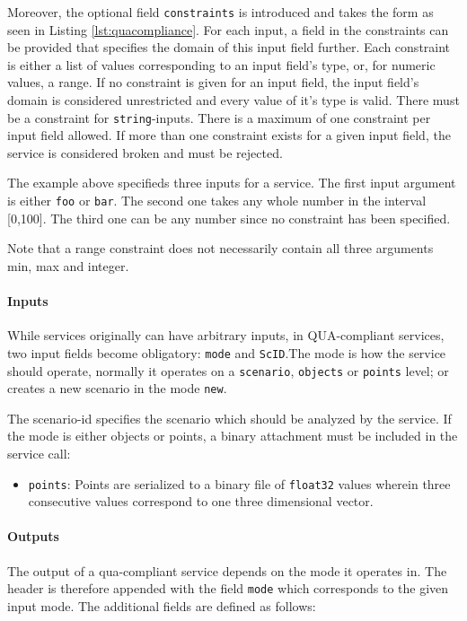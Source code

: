 Moreover, the optional field \texttt{constraints} is introduced and takes the form as seen in Listing \ref{lst:quacompliance}.
For each input, a field in the constraints can be provided that specifies the domain of this input field further. Each constraint is either a list of values corresponding to an input field's type, or, for numeric values, a range. If no constraint is given for an input field, the input field's domain is considered unrestricted and every value of it's type is valid. There must be a constraint for \texttt{string}-inputs. There is a maximum of one constraint per input field allowed. If more than one constraint exists for a given input field, the service is considered broken and must be rejected.

The example above specifieds three inputs for a service. The first input argument is either \texttt{foo} or \texttt{bar}. The second one takes any whole number in the interval [0,100]. The third one can be any number since no constraint has been specified.

Note that a range constraint does not necessarily contain all three arguments min, max and integer.

\paragraph{Inputs}
While services originally can have arbitrary inputs, in QUA-compliant services, two input fields become obligatory: \texttt{mode} and \texttt{ScID}.The mode is how the service should operate, normally it operates on a \texttt{scenario}, \texttt{objects} or \texttt{points} level; or creates a new scenario in the mode \texttt{new}.

The scenario-id specifies the scenario which should be analyzed by the service. If the mode is either objects or points, a binary attachment must be included in the service call:
\begin{itemize}
  \item \texttt{points}: Points are serialized to a binary file of \texttt{float32} values wherein three consecutive values correspond to one three dimensional vector.
\end{itemize}

\paragraph{Outputs}
The output of a qua-compliant service depends on the mode it operates in. The header is therefore appended with the field \texttt{mode} which corresponds to the given input mode. The additional fields are defined as follows:

